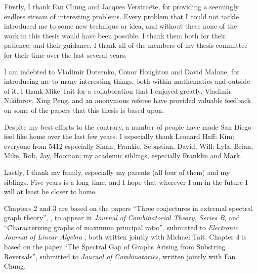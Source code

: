 \begin{frontmatter}
%
%
\begin{acknowledgements}

Firstly, I thank Fan Chung and Jacques Verstra\"{e}te, for providing a seemingly endless
stream of interesting problems.  Every problem that I could not tackle introduced me
to some new technique or idea, and without these none of the work in this thesis would have
been possible.  I thank them both for their patience, and their guidance.  I thank all
of the members of my thesis committee for their time over the last several years.


I am indebted to Vladimir Dotsenko, Conor Houghton and David Malone, for introducing me
to many interesting things, both within mathematics and outside of it.
I thank Mike Tait for a collaboration that I enjoyed greatly.
Vladimir Nikiforov, Xing Peng, and an anonymous referee have provided
valuable feedback on some of the papers that this thesis is based upon.


Despite my best efforts to the contrary, a number of people have made San Diego feel
like home over the last few years.  I especially thank Leonard Haff; Kim; everyone
from 5412 especially Sinan, Frankie, Sebastian, David, Will;  Lyla, Brian, Mike, Rob, Jay,
Hooman; my academic siblings, especially Franklin and Mark. 


Lastly, I thank my family, especially my parents (all four of them) and my siblings.
Five years is a long time, and I hope that wherever I am
in the future I will at least be closer to home.


Chapters 2 and 3 are based on the papers ``Three conjectures in extremal spectral graph theory'',
 \cite{TaitTobin2017}, to appear in \textit{Journal of Combinatorial Theory, Series B},
 and ``Characterizing graphs of maximum principal ratio'', submitted to
 \textit{Electronic Journal of Linear Algebra} \cite{TaitTobin2015},
 both written jointly with Michael Tait.
Chapter 4 is based on the paper ``The Spectral Gap of Graphs Arising from Substring Reversals'',
submitted to \textit{Journal of Combinatorics}, written jointly with Fan Chung.


\end{acknowledgements}
\end{frontmatter}
